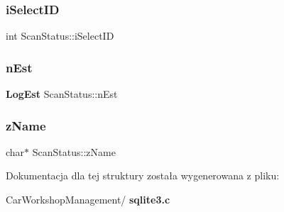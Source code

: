 \mbox{\label{struct_scan_status_a04e5536574db523ebfcdbecdfa39568a}} 
\subsubsection{iSelectID}
{\footnotesize\ttfamily int Scan\+Status\+::i\+Select\+ID}

\mbox{\label{struct_scan_status_af8666388f46040047c5e4bc9097d0336}} 
\subsubsection{nEst}
{\footnotesize\ttfamily \textbf{ Log\+Est} Scan\+Status\+::n\+Est}

\mbox{\label{struct_scan_status_ae88705a0b24b1bde60c87cdbde902c24}} 
\subsubsection{zName}
{\footnotesize\ttfamily char$\ast$ Scan\+Status\+::z\+Name}



Dokumentacja dla tej struktury została wygenerowana z pliku\+:\begin{DoxyCompactItemize}
\item 
Car\+Workshop\+Management/\textbf{ sqlite3.\+c}\end{DoxyCompactItemize}

